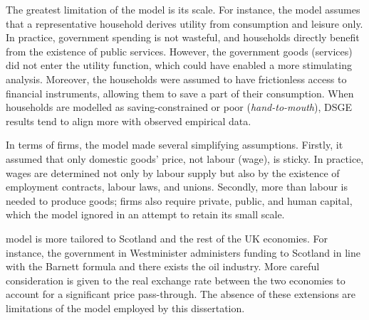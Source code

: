 The greatest limitation of the model is its scale. For instance, the model assumes that a representative household derives utility from consumption and leisure only. In practice, government spending is not wasteful, and households directly benefit from the existence of public services. However, the government goods (services) did not enter the utility function, which could have enabled a more stimulating analysis. Moreover, the households were assumed to have frictionless access to financial instruments, allowing them to save a part of their consumption. When households are modelled as saving-constrained or poor (\textit{hand-to-mouth}), DSGE results tend to align more with observed empirical data.

In terms of firms, the model made several simplifying assumptions. Firstly, it assumed that only domestic goods' price, not labour (wage), is sticky. In practice, wages are determined not only by labour supply but also by the existence of employment contracts, labour laws, and unions. Secondly, more than labour is needed to produce goods; firms also require private, public, and human capital, which the model ignored in an attempt to retain its small scale. 

\textcite{ricci_2019_essays} model is more tailored to Scotland and the rest of the UK economies. For instance, the government in Westminister administers funding to Scotland in line with the Barnett formula and there exists the oil industry. More careful consideration is given to the real exchange rate between the two economies to account for a significant price pass-through. The absence of these extensions are limitations of the model employed by this dissertation.